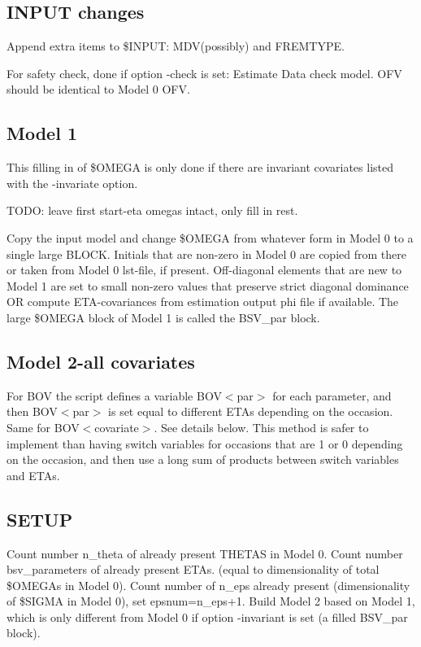 \documentclass[a4paper,12pt]{article}
\begin{document}
\subsection{INPUT changes}
Append extra items to \$INPUT: MDV(possibly) and FREMTYPE.

For safety check, done if option -check is set: Estimate Data check model. OFV should be identical to Model 0 OFV.

\subsection{Model 1}
This filling in of \$OMEGA is only done if there are invariant covariates listed with the -invariate option.

TODO: leave first start-eta omegas intact, only fill in rest.

Copy the input model and change \$OMEGA from whatever form in Model 0 to a single large BLOCK. Initials that are non-zero in Model 0 are copied from there or taken from Model 0 lst-file, if present. Off-diagonal elements that are new to Model 1 are set to small non-zero values that preserve strict diagonal dominance OR compute ETA-covariances from estimation output phi file if available. 
The large \$OMEGA block of Model 1 is called the BSV\_par block.


\subsection{Model 2-all covariates}

For BOV the script defines a variable BOV$<$par$>$ for each parameter, and then BOV$<$par$>$ is set equal to different ETAs depending on the occasion. Same for BOV$<$covariate$>$. See details below. This method is safer to implement than having switch variables for occasions that are 1 or 0 depending on the occasion, and then use a long sum of products between switch variables and ETAs. 

\subsection{SETUP}
Count number n\_theta of already present THETAS in Model 0. Count number bsv\_parameters of already present ETAs. (equal to dimensionality of total \$OMEGAs in Model 0). Count number of n\_eps already present (dimensionality of \$SIGMA in Model 0), set epsnum=n\_eps+1.
Build Model 2 based on Model 1, which is only different from Model 0 if option -invariant is set (a filled BSV\_par block).
\end{document}
